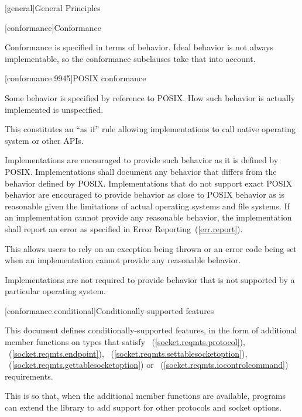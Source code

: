 
[general]{General Principles}

[conformance]{Conformance}

\pnum
 Conformance is specified in terms of behavior. Ideal behavior is not always implementable, so the conformance subclauses take that into account.


[conformance.9945]{POSIX conformance}

\pnum
 Some behavior is specified by reference to POSIX. How such behavior is actually implemented is unspecified.

\pnum
 \begin{note} This constitutes an ``as if'' rule allowing implementations to call native operating system or other APIs. \end{note}

\pnum
Implementations are encouraged to provide such behavior as it is defined by POSIX. Implementations shall document any behavior that differs from the behavior defined by POSIX. Implementations that do not support exact POSIX behavior are encouraged to provide behavior as close to POSIX behavior as is reasonable given the limitations of actual operating systems and file systems. If an implementation cannot provide any reasonable behavior, the implementation shall report an error as specified in Error Reporting~(\ref{err.report}).

\pnum
 \begin{note} This allows users to rely on an exception being thrown or an error code being set when an implementation cannot provide any reasonable behavior. \end{note}

\pnum
 Implementations are not required to provide behavior that is not supported by a particular operating system.



[conformance.conditional]{Conditionally-supported features}

\pnum
This document defines conditionally-supported features, in the form of additional member functions on types that satisfy ~(\ref{socket.reqmts.protocol}), ~(\ref{socket.reqmts.endpoint}), ~(\ref{socket.reqmts.settablesocketoption}), ~(\ref{socket.reqmts.gettablesocketoption}) or ~(\ref{socket.reqmts.iocontrolcommand}) requirements.

\pnum
 \begin{note} This is so that, when the additional member functions are available, \Cpp programs can extend the library to add support for other protocols and socket options. \end{note}

